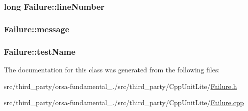 \subsubsection[{line\+Number}]{\setlength{\rightskip}{0pt plus 5cm}long Failure\+::line\+Number}\label{classFailure_a0b74b66c0460b6d7227b645e0f637e91}
\hypertarget{classFailure_ac1ce4e75209b0c66326740816305ab3f}{}
\subsubsection[{message}]{ Failure\+::message}\label{classFailure_ac1ce4e75209b0c66326740816305ab3f}
\hypertarget{classFailure_a39551c8439707923dae209e9e381dcfe}{}
\subsubsection[{test\+Name}]{ Failure\+::test\+Name}\label{classFailure_a39551c8439707923dae209e9e381dcfe}


The documentation for this class was generated from the following files\+:\begin{DoxyCompactItemize}
\item 
src/third\+\_\+party/orsa-\/fundamental\+\_./src/third\+\_\+party/\+Cpp\+Unit\+Lite/\hyperlink{Failure_8h}{Failure.\+h}\item 
src/third\+\_\+party/orsa-\/fundamental\+\_./src/third\+\_\+party/\+Cpp\+Unit\+Lite/\hyperlink{Failure_8cpp}{Failure.\+cpp}\end{DoxyCompactItemize}

